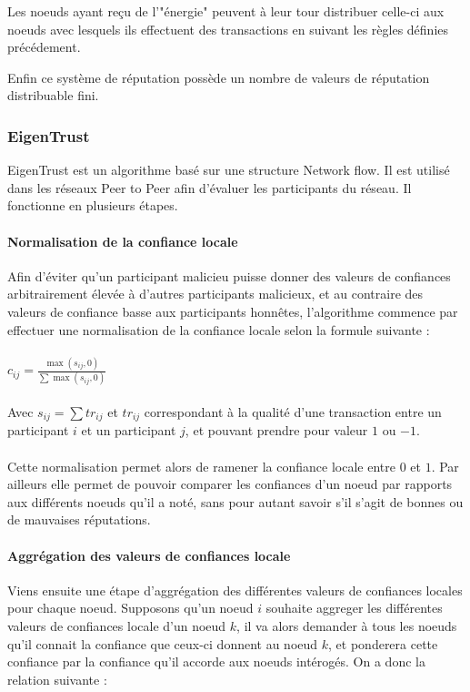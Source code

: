 \documentclass[a4paper, 11pt]{article} %
\begin{document}
Les noeuds ayant reçu de l'"énergie" peuvent à leur tour distribuer celle-ci aux noeuds avec lesquels ils effectuent des transactions en suivant les règles définies précédement.

Enfin ce système de réputation possède un nombre de valeurs de réputation distribuable fini.

\subsubsection{EigenTrust}
EigenTrust est un algorithme basé sur une structure Network flow. Il est utilisé dans les réseaux Peer to Peer afin d'évaluer les participants du réseau.
Il fonctionne en plusieurs étapes.

\paragraph{Normalisation de la confiance locale}
Afin d'éviter qu'un participant malicieu puisse donner des valeurs de confiances arbitrairement élevée à d'autres participants malicieux, et au contraire des valeurs de confiance basse aux participants honnêtes, l'algorithme commence par effectuer une normalisation de la confiance locale selon la formule suivante :
\paragraph{}
$c_{ij} = \frac{\max{(s_{ij},0)}}{\sum \max{(s_{ij},0)}}$
\paragraph{}
Avec $s_{ij} = \sum tr_{ij}$ et $tr_{ij}$ correspondant à la qualité d'une transaction entre un participant $i$ et un participant $j$, et pouvant prendre pour valeur $1$ ou $-1$.
\paragraph{}
Cette normalisation permet alors de ramener la confiance locale entre $0$ et $1$.
Par ailleurs elle permet de pouvoir comparer les confiances d'un noeud par rapports aux différents noeuds qu'il a noté, sans pour autant savoir s'il s'agit de bonnes ou de mauvaises réputations.

\paragraph{Aggrégation des valeurs de confiances locale}
Viens ensuite une étape d'aggrégation des différentes valeurs de confiances locales pour chaque noeud.
Supposons qu'un noeud $i$ souhaite aggreger les différentes valeurs de confiances locale d'un noeud $k$, il va alors demander à tous les noeuds qu'il connait la confiance que ceux-ci donnent au noeud $k$, et ponderera cette confiance par la confiance qu'il accorde aux noeuds intérogés.
On a donc la relation suivante :
\end{document}

